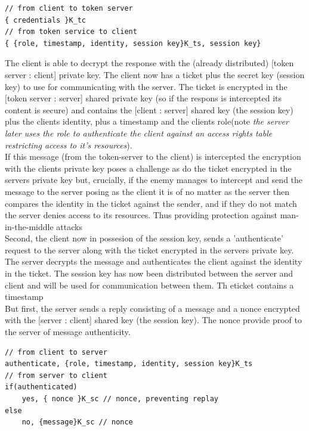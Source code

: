\begin{lstlisting}
// from client to token server
{ credentials }K_tc
// from token service to client
{ {role, timestamp, identity, session key}K_ts, session key} 
\end{lstlisting}

The client is able to decrypt the response with the (already distributed) [token server : client] private key. The client now has a ticket plus the secret key (session key) to use for communicating with the server. The ticket is encrypted in the [token server : server] shared private key (so if the respons is intercepted its content is secure) and contains the [client : server] shared key (the session key) plus the clients identity, plus a timestamp and the clients role(note \textit{the server later uses the role to authenticate the client against an access rights table restricting access to it's resources}). \\ 

If this message (from the token-server to the client) is intercepted the encryption with the clients private key poses a challenge as do the ticket encrypted in the servers private key but, crucially, if the enemy manages to intercept and send the message to the server posing as the client it is of no matter as the server then compares the identity in the ticket against the sender, and if they do not match the server denies access to its resources. Thus providing protection against man-in-the-middle attacks\\

Second, the client now in possesion of the session key, sends a 'authenticate' request to the server along with the ticket encrypted in the servers private key. The server decrypts the message and authenticates the client against the identity in the ticket. The session key has now been distributed between the server and client and will be used for communication between them. Th eticket contains a timestamp \\ 

But first, the server sends a reply consisting of a message and a nonce encrypted with the [server : client] shared key (the session key). The nonce provide proof to the server of message authenticity.

\begin{lstlisting}
// from client to server
authenticate, {role, timestamp, identity, session key}K_ts 
// from server to client
if(authenticated)
	yes, { nonce }K_sc // nonce, preventing replay
else
	no, {message}K_sc // nonce
\end{lstlisting}

